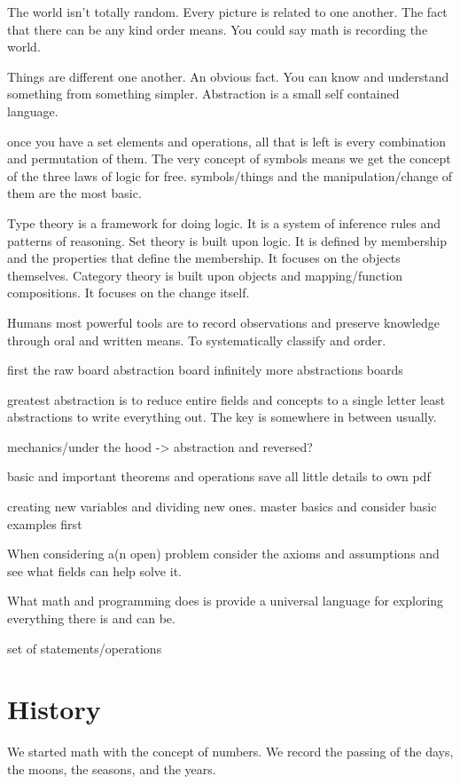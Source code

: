 \documentclass{book}
\begin{document}
The world isn't totally random. Every picture is related to one another. The fact that there can be any kind order means. You could say math is recording the world.

Things are different one another. An obvious fact. 
You can know and understand something from something simpler. 
Abstraction is a small self contained language. 



once you have a set elements and operations, all that is left is every combination and permutation of them.
The very concept of symbols means we get the concept of the three laws
of logic for free. symbols/things and the manipulation/change of them are the most basic.

Type theory is a framework for doing logic. It is a system of inference rules and patterns of reasoning.
Set theory is built upon logic. It is defined by membership and the properties that define the membership. It focuses on the objects themselves.
Category theory is built upon objects and mapping/function compositions. It focuses on the change itself.

Humans most powerful tools are to record observations and preserve knowledge through oral and written means.
To systematically classify and order.


first the raw board
abstraction board
infinitely more abstractions boards

greatest abstraction is to reduce entire fields and concepts to a single letter
least abstractions to write everything out.
The key is somewhere in between usually.

mechanics/under the hood -> abstraction and reversed?

basic and important theorems and operations
save all little details to own pdf

creating new variables and dividing new ones.
master basics and consider basic examples first

When considering a(n open) problem consider the axioms and assumptions and see what fields can help solve it.

What math and programming does is provide a universal language for exploring everything there is and can be.

set of statements/operations

\chapter{History}
We started math with the concept of numbers. 
We record the passing of the days, the moons, the seasons, and the years. 
\end{document}
